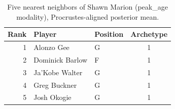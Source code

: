 \begin{table}[htbp]
  \centering\small
  \begin{tabular}{rllc}
    \toprule
    Rank & Player & Position & Archetype \\
    \midrule
    1 & Alonzo Gee & G & 1 \\
    2 & Dominick Barlow & F & 1 \\
    3 & Ja'Kobe Walter & G & 1 \\
    4 & Greg Buckner & G & 1 \\
    5 & Josh Okogie & G & 1 \\
    \bottomrule
  \end{tabular}
  \caption{Five nearest neighbors of Shawn Marion (peak_age modality), Procrustes-aligned posterior mean.}
  \label{tab:Shawn_Marion_neighbors_peak_age}
\end{table}

